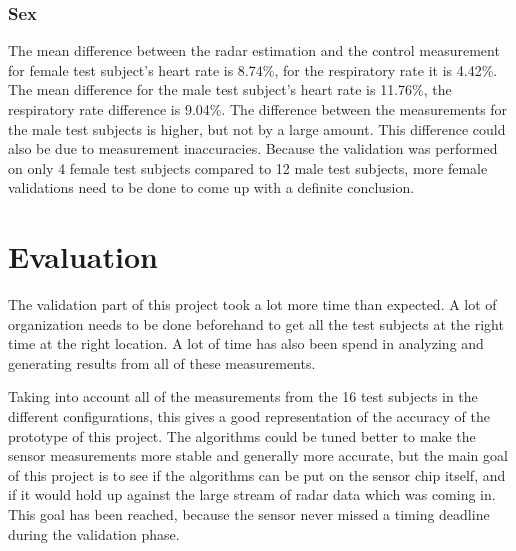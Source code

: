 \subsubsection{Sex}
The mean difference between the radar estimation and the control measurement for female test subject's heart rate is 8.74\%, for the respiratory rate it is 4.42\%. The mean difference for the male test subject's heart rate is 11.76\%, the respiratory rate difference is 9.04\%. The difference between the measurements for the male test subjects is higher, but not by a large amount. This difference could also be due to measurement inaccuracies. Because the validation was performed on only 4 female test subjects compared to 12 male test subjects, more female validations need to be done to come up with a definite conclusion.

\section{Evaluation}
The validation part of this project took a lot more time than expected. A lot of organization needs to be done beforehand to get all the test subjects at the right time at the right location. A lot of time has also been spend in analyzing and generating results from all of these measurements. 

Taking into account all of the measurements from the 16 test subjects in the different configurations, this gives a good representation of the accuracy of the prototype of this project. The algorithms could be tuned better to make the sensor measurements more stable and generally more accurate, but the main goal of this project is to see if the algorithms can be put on the sensor chip itself, and if it would hold up against the large stream of radar data which was coming in. This goal has been reached, because the sensor never missed a timing deadline during the validation phase. 